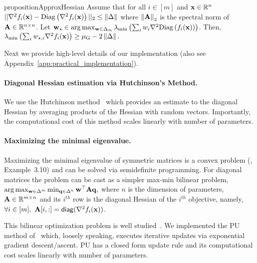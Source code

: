 \begin{restatable}{proposition}{ApproxHessian}
\label{thm:app_hessian}
    Assume that for all $i\in [m]$ and ${\mathbf{x}}\in \mathbb{R}^n$ $|| \nabla^2 f_i({\mathbf{x}}) - \mathrm{Diag}\left(\nabla^2 f_i({\mathbf{x}})\right) ||_2\leq \left\Vert\Delta\right\Vert$ where $\left\Vert{\mathbf{A}}\right\Vert_2$ is the spectral norm of ${\mathbf{A}}\in \mathbb{R}^{n\times n}$. Let ${\mathbf{w}}_\star \in \arg\max_{{\mathbf{w}}\in \Delta_{m}} \lambda_{\min} \left(\sum_{i} w_i \nabla^2 \mathrm{Diag}\left(f_i({\mathbf{x}})\right)\right)$. Then,
    $
        \lambda_{\min} \left(\sum_{i} w_{\star,i} \nabla^2  f_i({\mathbf{x}}) \right)\geq {\mu_{\mathrm{G}}} - 2\left\Vert\Delta\right\Vert.
    $
\end{restatable}

Next we provide high-level details of our implementation (also see Appendix~\ref{app:practical_implementation}).
\paragraph{Diagonal Hessian estimation via Hutchinson's Method.} We use the Hutchinson method~\cite{hutchinson1989stochastic, chapelle2011improved, yao2021adahessian} which provides an estimate to the diagonal Hessian by averaging products of the Hessian with random vectors. Importantly, the computational cost of this method scales linearly with number of parameters.

\paragraph{Maximizing the minimal eigenvalue.} Maximizing the minimal eigenvalue of symmetric matrices is a convex problem (\citet{boyd2004convex}, Example~3.10) and can be solved via semidefinite programming. For diagonal matrices the problem can be cast as a simpler max-min bilinear problem, 
$
    \arg\max_{{\mathbf{w}}\in \Delta^m} \min_{{\mathbf{q}}\in \Delta^n} {\mathbf{w}}^\top {\mathbf{A}} {\mathbf{q}},
$
where $n$ is the dimension of parameters, ${\mathbf{A}}\in \mathbb{R}^{m\times n}$ and its $i^{th}$ row is the diagonal Hessian of the $i^{th}$ objective, namely, $\forall i\in [m],\ \A[i,:]=\diag(\nabla^2 f_i(\x))$.

This bilinear optimization problem is well studied~\citep{rakhlin2013optimization,mertikopoulos2018mirror,daskalakis2018last}. We implemented the PU method of~\citet{cen2021fast} which, loosely speaking, executes iterative updates via exponential gradient descent/ascent. PU has a closed form update rule and its computational cost scales linearly with number of parameters.





